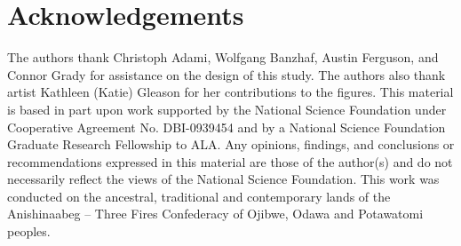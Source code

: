 \section*{Acknowledgements}

The authors thank Christoph Adami, Wolfgang Banzhaf, Austin Ferguson, and Connor Grady for assistance on the design of this study. The authors also thank artist Kathleen (Katie) Gleason for her contributions to the figures.
This material is based in part upon work supported by the National Science Foundation under Cooperative Agreement No. DBI-0939454 
and by a National Science Foundation Graduate Research Fellowship to ALA. 
Any opinions, findings, and conclusions or recommendations expressed in this material are those of the author(s) and do not necessarily reflect the views of the National Science Foundation.
This work was conducted on the ancestral, traditional and contemporary lands of the Anishinaabeg – Three Fires Confederacy of Ojibwe, Odawa and Potawatomi peoples.